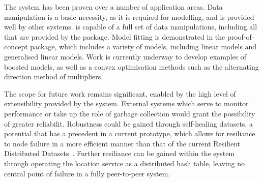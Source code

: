 The \lsr{} system has been proven over a number of application areas.
Data manipulation is a basic necessity, as it is required for modelling, and is provided well by other systems.
\lsr{} is capable of a full set of data manipulations, including all that are provided by the  package.
Model fitting is demonstrated in the proof-of-concept  package, which includes a variety of models, including linear models and generalised linear models.
Work is currently underway to develop examples of boosted models, as well as a convex optimisation methods such as the alternating direction method of multipliers.

The scope for future work remains significant, enabled by the high level of extensibility provided by the system.
External systems which serve to monitor performance or take up the role of garbage collection would grant the possibility of greater reliabilit.
Robustness could be gained through self-healing datasets, a potential that has a precedent in a current prototype, which allows for resiliance to node failure in a more efficient manner than that of the current Resilient Distributed Datasets~\cite{zaharia2012resilient}.
Further resiliance can be gained within the system through operating the location service as a distributed hash table, leaving no central point of failure in a fully peer-to-peer system.
